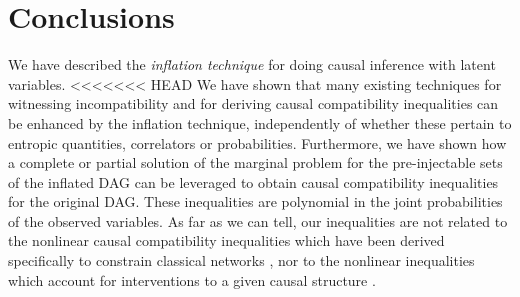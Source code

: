 {%





\section{Conclusions}

We have described the \emph{inflation technique} for doing causal inference with latent variables.
<<<<<<< HEAD
We have shown that many existing techniques for witnessing incompatibility and for deriving causal compatibility inequalities can be enhanced by the inflation technique, independently of whether these pertain to entropic quantities, correlators or probabilities.  Furthermore, we have shown how a complete or partial solution of the marginal problem for the pre-injectable sets of the inflated DAG can be leveraged to obtain causal compatibility inequalities  for the original DAG.  These inequalities are polynomial in the joint probabilities of the observed variables.  As far as we can tell, our inequalities are not related to the nonlinear causal compatibility inequalities which have been derived specifically to constrain classical networks \cite{TavakoliStarNetworks,RossetNetworks,TavakoliNoncyclicNetworks}, nor to the nonlinear inequalities which account for interventions to a given causal structure \cite{kang2007polynomialconstraints,steeg2011relaxation}.
}
